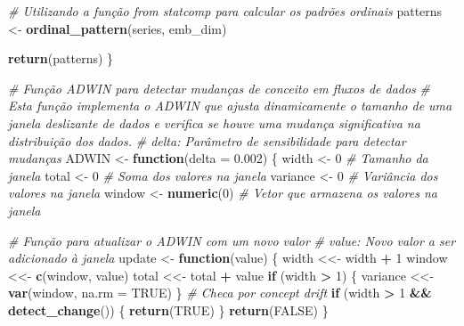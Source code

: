 \documentclass[
]{article}
\newenvironment{Shaded}{\begin{snugshade}}{\end{snugshade}}
\newcommand{\AttributeTok}[1]{\textcolor[rgb]{0.13,0.29,0.53}{#1}}
\newcommand{\CommentTok}[1]{\textcolor[rgb]{0.56,0.35,0.01}{\textit{#1}}}
\newcommand{\ConstantTok}[1]{\textcolor[rgb]{0.56,0.35,0.01}{#1}}
\newcommand{\ControlFlowTok}[1]{\textcolor[rgb]{0.13,0.29,0.53}{\textbf{#1}}}
\newcommand{\DecValTok}[1]{\textcolor[rgb]{0.00,0.00,0.81}{#1}}
\newcommand{\FloatTok}[1]{\textcolor[rgb]{0.00,0.00,0.81}{#1}}
\newcommand{\FunctionTok}[1]{\textcolor[rgb]{0.13,0.29,0.53}{\textbf{#1}}}
\newcommand{\NormalTok}[1]{#1}
\newcommand{\OtherTok}[1]{\textcolor[rgb]{0.56,0.35,0.01}{#1}}
\newcommand{\SpecialCharTok}[1]{\textcolor[rgb]{0.81,0.36,0.00}{\textbf{#1}}}
\begin{document}
\begin{Shaded}
\begin{Highlighting}[]
  \CommentTok{\# Utilizando a função from \textasciigrave{}statcomp\textasciigrave{} para calcular os padrões ordinais}
\NormalTok{  patterns }\OtherTok{\textless{}{-}} \FunctionTok{ordinal\_pattern}\NormalTok{(series, emb\_dim)}
  
  \FunctionTok{return}\NormalTok{(patterns)}
\NormalTok{\}}

\CommentTok{\# Função ADWIN para detectar mudanças de conceito em fluxos de dados}
\CommentTok{\# Esta função implementa o ADWIN que ajusta dinamicamente o tamanho de uma janela deslizante de dados e verifica se houve uma mudança significativa na distribuição dos dados.}
\CommentTok{\# delta: Parâmetro de sensibilidade para detectar mudanças}
\NormalTok{ADWIN }\OtherTok{\textless{}{-}} \ControlFlowTok{function}\NormalTok{(}\AttributeTok{delta =} \FloatTok{0.002}\NormalTok{) \{}
\NormalTok{  width }\OtherTok{\textless{}{-}} \DecValTok{0} \CommentTok{\# Tamanho da janela}
\NormalTok{  total }\OtherTok{\textless{}{-}} \DecValTok{0} \CommentTok{\# Soma dos valores na janela}
\NormalTok{  variance }\OtherTok{\textless{}{-}} \DecValTok{0} \CommentTok{\# Variância dos valores na janela}
\NormalTok{  window }\OtherTok{\textless{}{-}} \FunctionTok{numeric}\NormalTok{(}\DecValTok{0}\NormalTok{) }\CommentTok{\# Vetor que armazena os valores na janela}
  
  \CommentTok{\# Função para atualizar o ADWIN com um novo valor}
  \CommentTok{\# value: Novo valor a ser adicionado à janela}
\NormalTok{  update }\OtherTok{\textless{}{-}} \ControlFlowTok{function}\NormalTok{(value) \{}
\NormalTok{    width }\OtherTok{\textless{}\textless{}{-}}\NormalTok{ width }\SpecialCharTok{+} \DecValTok{1}
\NormalTok{    window }\OtherTok{\textless{}\textless{}{-}} \FunctionTok{c}\NormalTok{(window, value)}
\NormalTok{    total }\OtherTok{\textless{}\textless{}{-}}\NormalTok{ total }\SpecialCharTok{+}\NormalTok{ value}
    \ControlFlowTok{if}\NormalTok{ (width }\SpecialCharTok{\textgreater{}} \DecValTok{1}\NormalTok{) \{}
\NormalTok{      variance }\OtherTok{\textless{}\textless{}{-}} \FunctionTok{var}\NormalTok{(window, }\AttributeTok{na.rm =} \ConstantTok{TRUE}\NormalTok{)}
\NormalTok{    \}}
    \CommentTok{\# Checa por concept drift}
    \ControlFlowTok{if}\NormalTok{ (width }\SpecialCharTok{\textgreater{}} \DecValTok{1} \SpecialCharTok{\&\&} \FunctionTok{detect\_change}\NormalTok{()) \{}
      \FunctionTok{return}\NormalTok{(}\ConstantTok{TRUE}\NormalTok{)}
\NormalTok{    \}}
    \FunctionTok{return}\NormalTok{(}\ConstantTok{FALSE}\NormalTok{)}
\NormalTok{  \}}
  

\end{Highlighting}
\end{Shaded}
\end{document}
